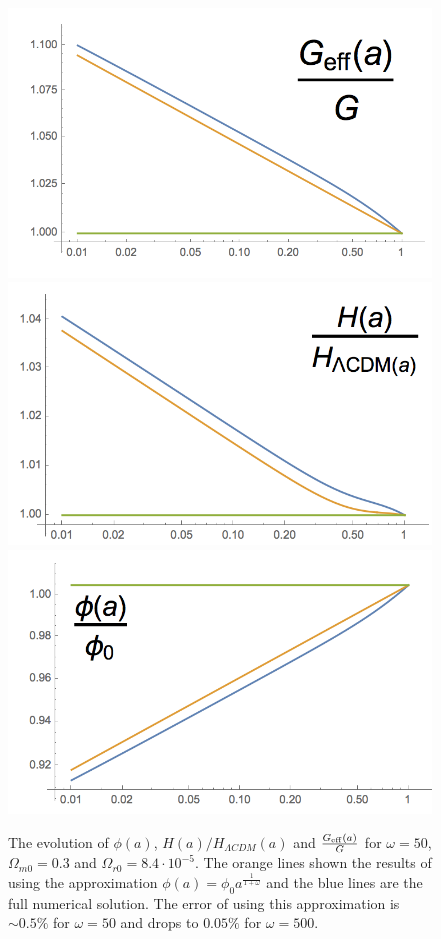 \documentclass[usenatbib]{article}
\begin{document}
\begin{figure}
\begin{center}
\includegraphics[width=0.9\columnwidth]{plots/pp1.png}
\includegraphics[width=0.9\columnwidth]{plots/pp2.png}
\includegraphics[width=0.9\columnwidth]{plots/pp3.png}
\caption{The evolution of $\phi(a)$, $H(a)/H_{\Lambda CDM}(a)$ and $\frac{G_{\rm eff}(a)}{G}$ for $\omega = 50$, $\Omega_{m0} = 0.3$ and $\Omega_{r0} = 8.4\cdot 10^{-5}$. The orange lines shown the results of using the approximation $\phi(a) = \phi_0 a^{\frac{1}{1+\omega}}$ and the blue lines are the full numerical solution. The error of using this approximation is $\sim 0.5\%$ for $\omega = 50$ and drops to $0.05\%$ for $\omega = 500$.}
\end{center}
\end{figure}
\end{document}
